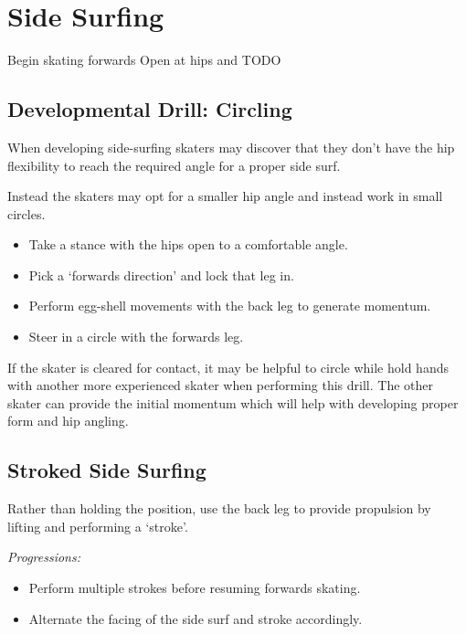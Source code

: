 \section{Side Surfing}
\label{sec:sticky/side_surf}

Begin skating forwards
Open at hips and   {\color{red} TODO} 



\subsection*{Developmental Drill: Circling}

When developing side-surfing skaters may discover that they don't have the hip flexibility to reach the required angle for a proper side surf.   

Instead the skaters may opt for a smaller hip angle and instead work in small circles. 

\begin{itemize}
\item Take a stance with the hips open to a comfortable angle.
\item Pick a `forwards direction' and lock that leg in. 
\item Perform egg-shell movements with the back leg to generate momentum. 
\item Steer in a circle with the forwards leg.
\end{itemize}


If the skater is cleared for contact, it may be helpful to circle while hold hands with another more experienced skater when performing this drill.  
The other skater can provide the initial momentum which will help with developing proper form and hip angling.  

\subsection*{Stroked Side Surfing}

Rather than holding the position, use the back leg to provide propulsion by lifting and performing a `stroke'.    

{\it Progressions:}
\begin{itemize}
\item Perform multiple strokes before resuming forwards skating.  
\item Alternate the facing of the side surf and stroke accordingly. 
\end{itemize}

